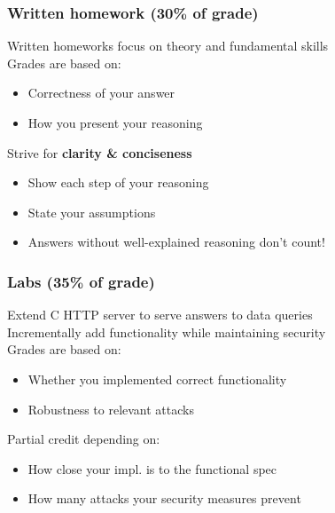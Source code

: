 \documentclass[10pt,handout]{beamer}
\begin{document}

\begin{frame}

\frametitle{Written homework (30\% of grade)}

Written homeworks focus on theory and fundamental skills
\\[1em]

Grades are based on:
\begin{itemize}
\item Correctness of your answer
\item How you present your reasoning\\[1em]
\end{itemize}

Strive for \textbf{clarity \& conciseness}
\begin{itemize}
\item Show each step of your reasoning
\item State your assumptions
\item Answers without well-explained reasoning don't count!
\end{itemize}

\end{frame}


\begin{frame}

\frametitle{Labs (35\% of grade)}

Extend C HTTP server to serve answers to data queries
\\[1em]

Incrementally add functionality while maintaining security
\\[1em]

Grades are based on:
\begin{itemize}
\item Whether you implemented correct functionality
\item Robustness to relevant attacks\\[1em]
\end{itemize}

Partial credit depending on:
\begin{itemize}
  \item How close your impl. is to the functional spec
  \item How many attacks your security measures prevent
\end{itemize}

\end{frame}
\end{document}
